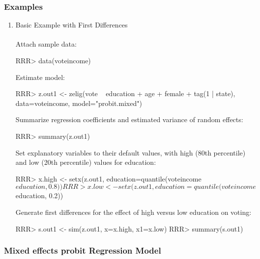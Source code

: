 \subsubsection{Examples}

\begin{enumerate}
\item Basic Example with First Differences \\
\\
Attach sample data: \\
\begin{Schunk}
\begin{Sinput}
RRR> data(voteincome)
\end{Sinput}
\end{Schunk}
Estimate model:
\begin{Schunk}
\begin{Sinput}
RRR> z.out1 <- zelig(vote ~ education + age + female + tag(1 | state), data=voteincome, model="probit.mixed")
\end{Sinput}
\end{Schunk}

\noindent Summarize regression coefficients and estimated variance of random effects:\\
\begin{Schunk}
\begin{Sinput}
RRR> summary(z.out1)
\end{Sinput}
\end{Schunk}
Set explanatory variables to their default values, with high (80th percentile) and low (20th percentile) values for education:\\
\begin{Schunk}
\begin{Sinput}
RRR> x.high <- setx(z.out1, education=quantile(voteincome$education, 0.8))
RRR> x.low <- setx(z.out1, education=quantile(voteincome$education, 0.2))
\end{Sinput}
\end{Schunk}
Generate first differences for the effect of high versus low education on voting: \\
\begin{Schunk}
\begin{Sinput}
RRR> s.out1 <- sim(z.out1, x=x.high, x1=x.low)
RRR> summary(s.out1)
\end{Sinput}
\end{Schunk}

\end{enumerate}

\subsubsection{Mixed effects probit Regression Model}

